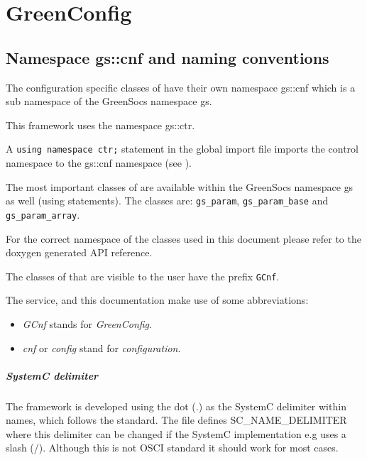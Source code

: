 
\cleardoublepage
\chapter{GreenConfig}
\label{GreenConfig}

\section{Namespace gs::cnf and naming conventions}
The configuration specific classes of \GreenConfig have their own namespace {\sffamily gs::cnf} which is a sub namespace of the GreenSocs namespace {\sffamily gs}.

This framework uses the \GreenControl namespace {\sffamily gs::ctr}.

A \lstinline[language=TeX]|using namespace ctr;| statement in the \GreenConfig global import file imports the control namespace to the {\sffamily gs::cnf} namespace (see ).

The most important classes of \GreenConfig are available within the GreenSocs namespace {\sffamily gs} as well (using statements). The classes are: \lstinline|gs_param|, \lstinline|gs_param_base| and \lstinline|gs_param_array|.


For the correct namespace of the classes used in this document please
refer to the doxygen generated API reference.

The classes of \GreenConfig that are visible to the user have the prefix \lstinline|GCnf|.

The \GreenConfig service, and this documentation make use of some abbreviations:
\begin{itemize}
	\item \emph{GCnf} stands for {\em GreenConfig}.
	\item \emph{cnf} or \emph{config} stand for {\em configuration}.
\end{itemize}

\paragraph{SystemC delimiter} The \GreenConfig framework is developed using the dot ({\sffamily .}) as the SystemC delimiter within names, which follows the standard. The file  defines {\sffamily SC\_NAME\_DELIMITER} where this delimiter can be changed if the SystemC implementation e.g uses a slash ({\sffamily /}). Although this is not OSCI standard it should work for most cases.

